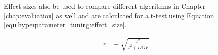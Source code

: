 Effect sizes also be used to compare different algorithms in Chapter \ref{chap:evaluation} as well and are calculated for a t-test using Equation \ref{equ:hyperparameter_tuning:effect_size}.

\begin{equation}
	\begin{split}
		r & = \sqrt{\frac{t^2}{t^2 + DOF}}
	\end{split}
	 \label{equ:hyperparameter_tuning:effect_size}
\end{equation}




